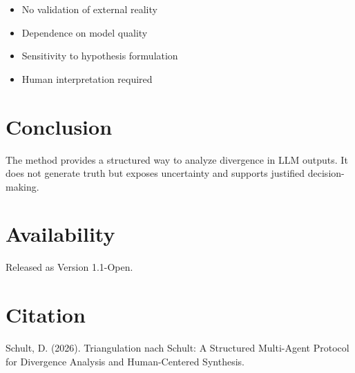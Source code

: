 \documentclass[11pt]{article}
\begin{document}
\begin{itemize}
\item No validation of external reality
\item Dependence on model quality
\item Sensitivity to hypothesis formulation
\item Human interpretation required
\end{itemize}

\section{Conclusion}

The method provides a structured way to analyze divergence in LLM outputs.
It does not generate truth but exposes uncertainty and supports justified decision-making.

\section{Availability}

Released as Version 1.1-Open.

\section{Citation}

Schult, D. (2026). 
Triangulation nach Schult: A Structured Multi-Agent Protocol for Divergence Analysis and Human-Centered Synthesis.
\end{document}
